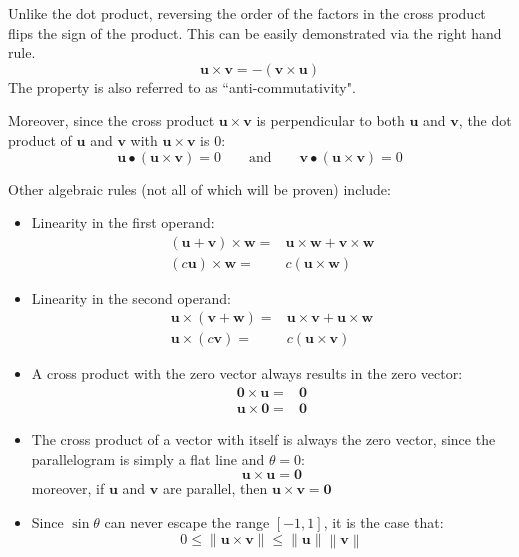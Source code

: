 \documentclass{article}
\begin{document}
\vspace{5mm}

Unlike the dot product, reversing the order of the factors in the cross product flips the sign of the product. This can be easily demonstrated via the right hand rule. 
\[\mathbf{u} \times \mathbf{v} = -(\mathbf{v} \times \mathbf{u})\]
The property is also referred to as ``anti-commutativity".

Moreover, since the cross product \(\mathbf{u} \times \mathbf{v}\) is perpendicular to both \(\mathbf{u}\) and \(\mathbf{v}\), the dot product of \(\mathbf{u}\) and \(\mathbf{v}\) with \(\mathbf{u} \times \mathbf{v}\) is \(0\):
\[\mathbf{u} \bullet (\mathbf{u} \times \mathbf{v}) = 0 \quad\quad\text{and}\quad\quad \mathbf{v} \bullet (\mathbf{u} \times \mathbf{v}) = 0\]

Other algebraic rules (not all of which will be proven) include:

\begin{centering}
\begin{itemize}
\item Linearity in the first operand:
\begin{align*}
(\mathbf{u} + \mathbf{v}) \times \mathbf{w} = & \mathbf{u} \times \mathbf{w} + \mathbf{v} \times \mathbf{w} \\ 
(c\mathbf{u}) \times \mathbf{w} = & c(\mathbf{u} \times \mathbf{w}) 
\end{align*}
\item Linearity in the second operand:
\begin{align*}
\mathbf{u} \times (\mathbf{v} + \mathbf{w}) = & \mathbf{u} \times \mathbf{v} + \mathbf{u} \times \mathbf{w} \\ 
\mathbf{u} \times (c\mathbf{v}) = & c(\mathbf{u} \times \mathbf{v}) 
\end{align*}
\item A cross product with the zero vector always results in the zero vector:
\begin{align*}
\mathbf{0} \times \mathbf{u} = & \mathbf{0} \\ 
\mathbf{u} \times \mathbf{0} = & \mathbf{0}
\end{align*}
\item The cross product of a vector with itself is always the zero vector, since the parallelogram is simply a flat line and \(\theta = 0\):
\[\mathbf{u} \times \mathbf{u} = \mathbf{0}\]
moreover, if \(\mathbf{u}\) and \(\mathbf{v}\) are parallel, then \(\mathbf{u} \times \mathbf{v} = \mathbf{0}\)
\item Since \(\sin\theta\) can never escape the range \([-1, 1]\), it is the case that:
\[0 \leq \left\|\mathbf{u} \times \mathbf{v}\right\| \leq \left\|\mathbf{u}\right\| \left\|\mathbf{v}\right\|\]
\end{itemize}
\end{centering}
\end{document}
